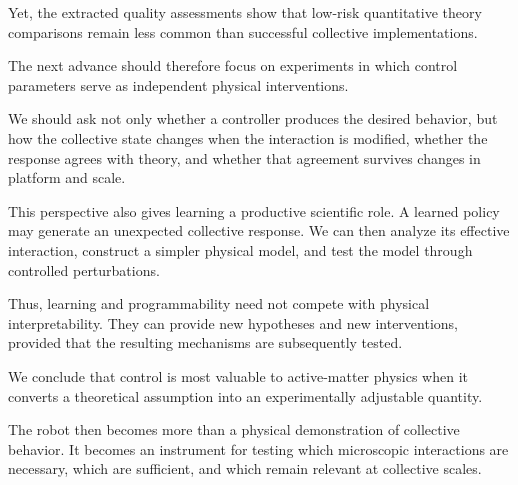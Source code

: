 Yet, the extracted
quality assessments
show that low-risk
quantitative
theory comparisons
remain less common
than successful
collective
implementations.

The next advance
should therefore
focus on experiments
in which control
parameters serve
as independent
physical interventions.

We should ask
not only whether
a controller
produces the
desired behavior,
but how the
collective state
changes when
the interaction
is modified,
whether the
response agrees
with theory,
and whether
that agreement
survives changes
in platform
and scale.

This perspective
also gives learning
a productive
scientific role.
A learned policy
may generate
an unexpected
collective response.
We can then
analyze its
effective interaction,
construct a
simpler physical
model, and
test the model
through controlled
perturbations.

Thus, learning
and programmability
need not compete
with physical
interpretability.
They can provide
new hypotheses
and new interventions,
provided that
the resulting
mechanisms are
subsequently tested.

We conclude that
control is most
valuable to
active-matter
physics when
it converts
a theoretical
assumption
into an
experimentally
adjustable
quantity.

The robot
then becomes
more than
a physical
demonstration
of collective
behavior.
It becomes
an instrument
for testing
which microscopic
interactions
are necessary,
which are
sufficient,
and which
remain relevant
at collective
scales.


